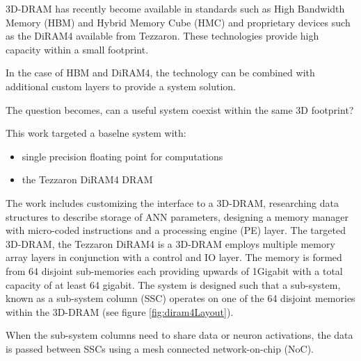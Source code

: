 \documentclass[journal]{IEEEtran}
\begin{document}

3D-DRAM has recently become available in standards such as High Bandwidth Memory (HBM) and Hybrid Memory Cube (HMC) and proprietary devices such as the DiRAM4 available from Tezzaron. 
These technologies provide high capacity within a small footprint.

In the case of HBM and DiRAM4, the technology can be combined with additional custom layers to provide a system solution.

The question becomes, can a useful system coexist within the same 3D footprint?

This work targeted a baselne system with:
\begin{itemize}
  \item single precision floating point for computations
  \item the Tezzaron DiRAM4 DRAM \cite{tezzaron:diram4}

\end{itemize}
The work includes customizing the interface to a 3D-DRAM, researching data structures to describe storage of ANN parameters, designing a memory manager with micro-coded instructions and a processing engine (PE) layer.  
The targeted 3D-DRAM, the Tezzaron DiRAM4 is a 3D-DRAM employs multiple memory array layers in conjunction with a control and IO layer.
The memory is formed from 64 disjoint sub-memories each providing upwards of 1Gigabit with a total capacity of at least 64 gigabit.
The system is designed such that a sub-system, known as a sub-system column (SSC) operates on one of the 64 disjoint memories within the 3D-DRAM (see figure \ref{fig:diram4Layout}).

When the sub-system columns need to share data or neuron activations, the data is passed between SSCs using a mesh connected network-on-chip (NoC).
\end{document}
